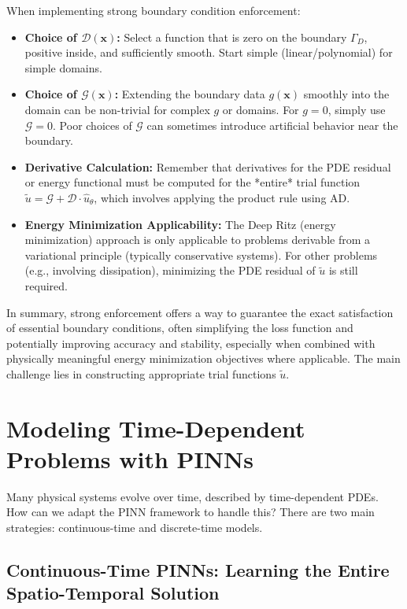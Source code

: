 When implementing strong boundary condition enforcement:
\begin{itemize}
    \item \textbf{Choice of $\mathcal{D}(\mathbf{x})$:} Select a function that is zero on the boundary $\Gamma_D$, positive inside, and sufficiently smooth. Start simple (linear/polynomial) for simple domains.
    \item \textbf{Choice of $\mathcal{G}(\mathbf{x})$:} Extending the boundary data $g(\mathbf{x})$ smoothly into the domain can be non-trivial for complex $g$ or domains. For $g=0$, simply use $\mathcal{G}=0$. Poor choices of $\mathcal{G}$ can sometimes introduce artificial behavior near the boundary.
    \item \textbf{Derivative Calculation:} Remember that derivatives for the PDE residual or energy functional must be computed for the *entire* trial function $\tilde{u} = \mathcal{G} + \mathcal{D} \cdot \hat{u}_\theta$, which involves applying the product rule using AD.
    \item \textbf{Energy Minimization Applicability:} The Deep Ritz (energy minimization) approach is only applicable to problems derivable from a variational principle (typically conservative systems). For other problems (e.g., involving dissipation), minimizing the PDE residual of $\tilde{u}$ is still required.
\end{itemize}

In summary, strong enforcement offers a way to guarantee the exact satisfaction of essential boundary conditions, often simplifying the loss function and potentially improving accuracy and stability, especially when combined with physically meaningful energy minimization objectives where applicable. The main challenge lies in constructing appropriate trial functions $\tilde{u}$.

\section{Modeling Time-Dependent Problems with PINNs}
\label{sec:time_models}

Many physical systems evolve over time, described by time-dependent PDEs. How can we adapt the PINN framework to handle this? There are two main strategies: continuous-time and discrete-time models.

\subsection{Continuous-Time PINNs: Learning the Entire Spatio-Temporal Solution}
\label{sec:continuous_time}

